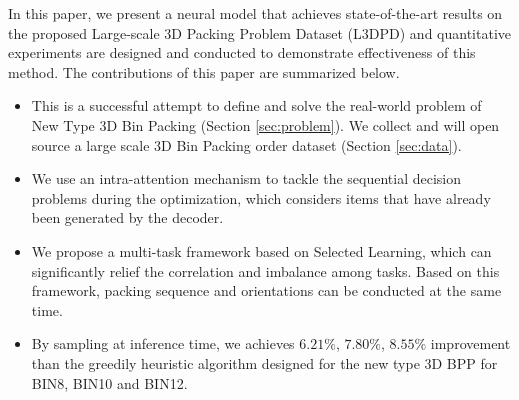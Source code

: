 In this paper, we present a neural model that achieves state-of-the-art results on the proposed Large-scale 3D Packing Problem Dataset (L3DPD) and 
quantitative experiments are designed and conducted to demonstrate effectiveness of this method. The contributions of this paper are summarized below.
\begin{itemize}	
	\item This is a successful attempt to define and solve the real-world problem of New Type 3D Bin Packing (Section \ref{sec:problem}).
		We collect and will open source a large scale 3D Bin Packing order dataset (Section \ref{sec:data}).
	\item We use an intra-attention mechanism to tackle the sequential decision problems during the optimization, which considers items that have already been generated by the decoder.  
	\item We propose a multi-task framework based on Selected Learning, which can significantly relief the correlation and imbalance among tasks. Based on this framework, packing sequence and orientations can be conducted at the same time. 
	\item By sampling at inference time, we achieves $6.21\%$, $7.80\%$, $8.55\%$ improvement than the greedily heuristic algorithm designed for the new type 3D BPP for BIN8, BIN10 and BIN12.
\end{itemize}


